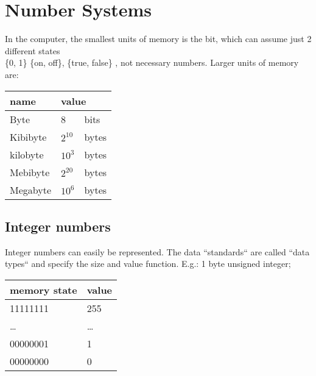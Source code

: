 \chapter{Number Systems}\label{ch:number-systems2}
In the computer, the smallest units of memory is the bit, which can assume
just 2 different states \\
\{0, 1\} \{on, off\}, \{true, false\} , not necessary numbers.
Larger units of memory are:
\begin{center}
    \begin{tabular}{ l l @{ }l}
        \toprule
        name & \multicolumn{2}{l}{value} \\
        \midrule
        Byte     & 8        & bits  \\
        Kibibyte & $2^{10}$ & bytes \\
        kilobyte & $10^3$   & bytes \\
        Mebibyte & $2^{20}$ & bytes \\
        Megabyte & $10^6$   & bytes \\
        \bottomrule
    \end{tabular}
\end{center}


\section{Integer numbers}\label{sec:integer-numbers}
Integer numbers can easily be represented.
The data ``standards`` are called ``data types`` and specify the size and value function.
E.g.: 1 byte unsigned integer;
\begin{center}
    \begin{tabular}{ l l }
        \toprule
        memory state & value  \\
        \midrule
        11111111     & 255    \\
        \ldots       & \ldots \\
        00000001     & 1      \\
        00000000     & 0      \\
        \bottomrule
    \end{tabular}
\end{center}

